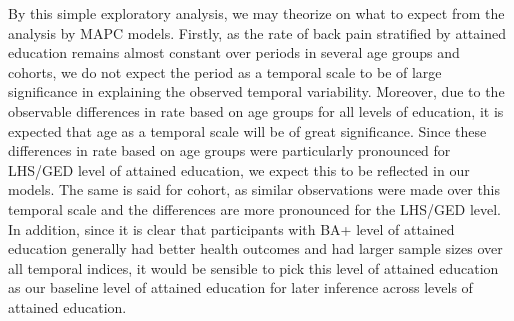 By this simple exploratory analysis, we may theorize on what to expect from the analysis by MAPC models. Firstly, as the rate of back pain stratified by attained education remains almost constant over periods in several age groups and cohorts, we do not expect the period as a temporal scale to be of large significance in explaining the observed temporal variability. Moreover, due to the observable differences in rate based on age groups for all levels of education, it is expected that age as a temporal scale will be of great significance. Since these differences in rate based on age groups were particularly pronounced for LHS/GED level of attained education, we expect this to be reflected in our models. The same is said for cohort, as similar observations were made over this temporal scale and the differences are more pronounced for the LHS/GED level. In addition, since it is clear that participants with BA+ level of attained education generally had better health outcomes and had larger sample sizes over all temporal indices, it would be sensible to pick this level of attained education as our baseline level of attained education for later inference across levels of attained education.











